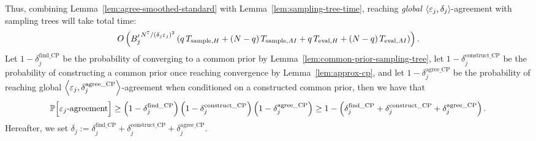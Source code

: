 Thus, combining Lemma~\ref{lem:agree-smoothed-standard} with Lemma~\ref{lem:sampling-tree-time}, reaching \emph{global} $\left \langle \varepsilon_j, \delta_j \right \rangle $-agreement with sampling trees will take total time:
\begin{equation}\label{eq:new-tree-time}
O\left({B'_j}^{{N^7}/{\left(\delta_j\varepsilon_j\right)^2}}\left(q\,T_{\text{sample},H} + (N-q)\,T_{\text{sample},AI} + q\,T_{\text{eval},H} + (N-q)\,T_{\text{eval},AI}\right)\right).
\end{equation}
Let $1-\delta^{\text{find\_CP}}_j$ be the probability of converging to a common prior by Lemma~\ref{lem:common-prior-sampling-tree},
let $1-\delta^{\text{construct\_CP}}_j$ be the probability of constructing a common prior once reaching convergence by Lemma~\ref{lem:approx-cp}, and let $1-\delta^{\text{agree\_CP}}_j$ be the probability of reaching global $\left \langle \varepsilon_j, \delta^{\text{agree\_CP}}_j \right \rangle $-agreement when conditioned on a constructed common prior, then we have that
\begin{equation*}
\mathbb{P}\Bigl[\text{$\varepsilon_j$-agreement}\Bigr] \ge \left(1-\delta^{\text{find\_CP}}_j\right)\left(1-\delta^{\text{construct\_CP}}_j\right)\left(1-\delta^{\text{agree\_CP}}_j\right) \ge 1 - \left(\delta^{\text{find\_CP}}_j + \delta^{\text{construct\_CP}}_j + \delta^{\text{agree\_CP}}_j\right).
\end{equation*}
Hereafter, we set $\delta_j := \delta^{\text{find\_CP}}_j + \delta^{\text{construct\_CP}}_j + \delta^{\text{agree\_CP}}_j$.

